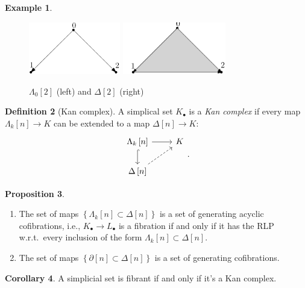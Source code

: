 \documentclass[10pt,letterpaper,cm]{nupset}
\theoremstyle{definition}
\newtheorem{defn}{Definition}[subsection]
\newtheorem{exmp}[defn]{Example}
\theoremstyle{theorem}
\newtheorem{prop}[defn]{Proposition}
\newtheorem{corollary}[defn]{Corollary}
\theoremstyle{remark}
\newcommand{\1}{\mathbb{1}}
\newcommand{\0}{\vec 0}
\newcommand{\be}{\begin{enumerate}}
\newcommand{\ee}{\end{enumerate}}
\begin{document}
\begin{exmp}\label{zhorn} $ $
\begin{figure}[H]     
\centering 
\includegraphics[width=40mm]{zero-horn.png}
\quad \quad  \scalebox{2.4}{$\hookrightarrow$} \quad  \quad 
\includegraphics[width=45mm]{two-simplex.png}
 \caption{$\Lambda_0\left[2\right]$ (left) and $\Delta\left[2\right]$ (right)}
\end{figure}
\end{exmp}

\begin{defn}[Kan complex]
A simplical set $K_{\bullet}$ is a \textit{Kan complex} if every map $\Lambda_k\left[n\right] \to K$ can be extended to a map $\Delta\left[n\right] \to K$:
\[
\begin{tikzcd}
	{\Lambda_k\left[n\right]} & K \\
	{\Delta\left[n\right]}
	\arrow[hook, from=1-1, to=2-1]
	\arrow[from=1-1, to=1-2]
	\arrow[dashed, from=2-1, to=1-2]
\end{tikzcd}
.\]
\end{defn}

\begin{prop} $ $
\be
\item The set of maps $\left\{\Lambda_k\left[n\right] \subset \Delta\left[n\right]\right\}$ is a set of generating acyclic cofibrations, i.e., $K_{\bullet} \to L_{\bullet}$ is a fibration if and only if it has the RLP w.r.t.\ every inclusion  of the form $\Lambda_k\left[n\right] \subset \Delta\left[n\right]$.
\item The set of maps $\left\{\partial{\left[n\right]} \subset \Delta\left[n\right]\right\}$ is a set of generating cofibrations.
\ee
\end{prop}

\begin{corollary}
A simplicial set is fibrant if and only if it's a Kan complex.
\end{corollary}
\end{document}
